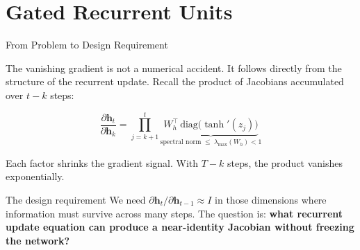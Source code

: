 \documentclass[aspectratio=169]{beamer}
\begin{document}
\section{Gated Recurrent Units}
%
\begin{frame}{From Problem to Design Requirement}

The vanishing gradient is not a numerical accident. It follows directly from the structure of the
recurrent update. Recall the product of Jacobians accumulated over $t - k$ steps:

\[
  \frac{\partial \boldsymbol{h}_t}{\partial \boldsymbol{h}_k}
  = \prod_{j=k+1}^{t} \underbrace{W_h^{\top}\,\mathrm{diag}\!\bigl(\tanh'(z_j)\bigr)}_{\text{spectral norm} \;\leq\; \lambda_{\max}(W_h) < 1}
\]

Each factor shrinks the gradient signal. With $T - k$ steps, the product vanishes exponentially.

\medskip

\begin{block}{The design requirement}
We need $\partial \boldsymbol{h}_t / \partial \boldsymbol{h}_{t-1} \approx I$ in those dimensions where information
must survive across many steps.
The question is: \textbf{what recurrent update equation can produce a near-identity Jacobian
without freezing the network?}
\end{block}

\end{frame}
%
%
\end{document}
